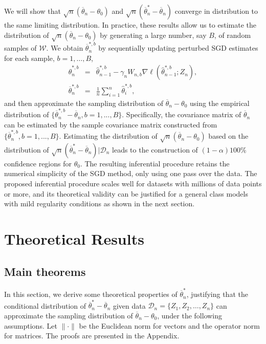 \documentclass[twoside,11pt]{article}
\def\wh{\widehat}
\def\ol{\overline}
\begin{document}
We will show that $\sqrt{n}(\ol{\theta}_n-{\theta}_0)$ and $\sqrt{n}(\ol{\theta}^*_n-\ol{\theta}_n)$ converge in distribution to the same limiting distribution. In practice, these results allow us to estimate the distribution of $\sqrt{n}(\ol{\theta}_n-{\theta}_0)$ by generating a large number, say $B$, of random samples of $\mathcal{W}$. We obtain  $\ol{\theta}^{*,b}_n$ by sequentially updating perturbed SGD estimates for each sample, $b=1, \dots, B$,
\begin{eqnarray}
\wh{\theta}^{*,b}_n&=&\wh{\theta}^{*,b}_{n-1}-\gamma_nW_{n,b}\nabla \ell(\wh{\theta}^{*,b}_{n-1}; Z_n),\label{SGD-wt-b}\\
\ol{\theta}^{*,b}_n&=&\frac{1}{n}\sum_{i=1}^n\wh{\theta}^{*,b}_i,\label{SGD-avg-wt-b}
\end{eqnarray}
and then approximate the sampling distribution of $\ol{\theta}_n-\theta_0$ using the empirical distribution of $\{\ol{\theta}^{*,b}_n-\ol{\theta}_n, b = 1, ..., B\}$. Specifically, the covariance matrix of $\ol{\theta}_n$ can be estimated by the sample covariance matrix constructed from $\{\ol{\theta}^{*,b}_n,b = 1,...,B\}$. Estimating the distribution of $\sqrt{n}(\ol{\theta}_n-{\theta}_0)$ based on the distribution of $\sqrt{n}(\ol{\theta}^*_n-\ol{\theta}_n)|\mathcal{D}_n$ leads to the construction of $(1-\alpha)100\%$ confidence regions for $\theta_0$. The resulting inferential procedure retains the numerical simplicity of the SGD method, only using one pass over the data. The proposed inferential procedure scales well for datasets with millions of data points or more, and its theoretical validity can be justified for a general class models with mild regularity conditions as shown in the next section.




\section{Theoretical Results}

\subsection{Main theorems}

In this section, we derive some theoretical properties of $\ol{\theta}_n^*$, justifying that the conditional distribution of $\ol{\theta}_n^*-\ol{\theta}_n$ given data $\mathcal{D}_n=\{Z_1, Z_2, \dots, Z_n\}$ can approximate the sampling distribution of $\ol{\theta}_n-\theta_0$, under the following assumptions. Let $\|\cdot\|$ be the Euclidean norm for vectors and the operator norm for matrices. The proofs are presented in the Appendix.
\end{document}

